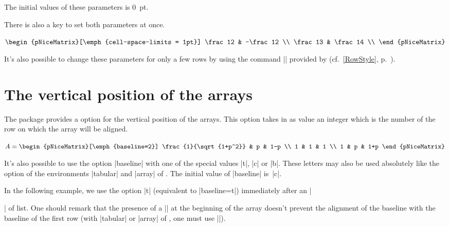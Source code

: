 \documentclass[dvipsnames]{article}
\begin{document}
\smallskip
The initial values of these parameters is $0$~pt.

\smallskip
There is also a key  to set both parameters at
once.

\medskip
\begin{Code}[width=9cm,show-output]
$\begin{pNiceMatrix}[\emph{cell-space-limits = 1pt}]
\frac12 & -\frac12 \\
\frac13 & \frac14 \\
\end{pNiceMatrix}$
\end{Code}

\bigskip
It's also possible to change these parameters for only a few rows by using the 
command |\RowStyle| provided by  (cf.~\ref{RowStyle}, p.~\pageref{RowStyle}).



\bigskip
\section{The vertical position of the arrays}


The package  provides a option  for the
vertical position of the arrays. This option takes in as value an integer which
is the number of the row on which the array will be aligned.

\medskip
\begin{Code}[width=9cm,show-output,no-cell-nodes]
$A = \begin{pNiceMatrix}[\emph{baseline=2}]
\frac{1}{\sqrt{1+p^2}} & p & 1-p \\
1 & 1 & 1 \\
1 & p & 1+p
\end{pNiceMatrix}$
\end{Code}


\medskip
It's also possible to use the option |baseline| with one of the special values
|t|, |c| or |b|. These letters may also be used absolutely like the option of
the environments |{tabular}| and |{array}| of . The initial value
of |baseline| is~|c|. 


\medskip
In the following example, we use the option |t| (equivalent to |baseline=t|)
immediately after an |\item| of list. One should remark that the presence of a
|\hline| at the beginning of the array doesn't prevent the alignment of the
baseline with the baseline of the first row (with |{tabular}| or |{array}| of
, one must use |\firsthline|).
\end{document}
